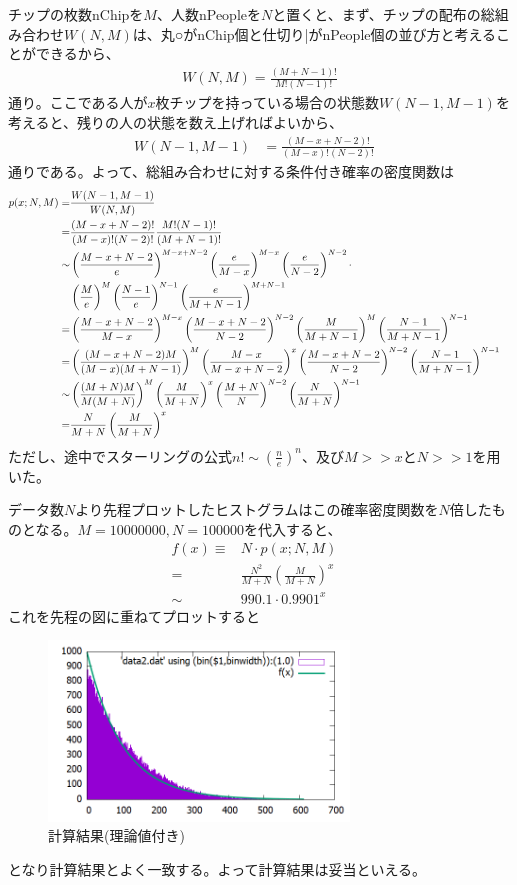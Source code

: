 \documentclass[ %
  platex,%
  papersize,%
  twocolumn,
  landscape
]{jsarticle}
\begin{document}
チップの枚数nChipを$M$、人数nPeopleを$N$と置くと、まず、チップの配布の総組み合わせ$W(N,M)$は、丸○がnChip個と仕切り|がnPeople個の並び方と考えることができるから、
\begin{align}
  W(N,M)=\frac{(M+N-1)!}{M!(N-1)!}
\end{align}
通り。ここである人が$x$枚チップを持っている場合の状態数$W(N-1,M-1)$を考えると、残りの人の状態を数え上げればよいから、
\begin{align}
  W(N-1,M-1)&=\frac{(M-x+N-2)!}{(M-x)!(N-2)!}&
\end{align}
通りである。よって、総組み合わせに対する条件付き確率の密度関数は
\begin{align}
  p(x;N,M)=&\frac{W(N-1,M-1)}{W(N,M)}&\\
  =&\frac{(M-x+N-2)!}{(M-x)!(N-2)!}\frac{M!(N-1)!}{(M+N-1)!}&\\
  \sim&\left(\frac{M-x+N-2}{e}\right)^{M-x+N-2}\left(\frac{e}{M-x}\right)^{M-x}\left(\frac{e}{N-2}\right)^{N-2}\cdot\relax&\\\nonumber&\left(\frac{M}{e}\right)^{M}\left(\frac{N-1}{e}\right)^{N-1}\left(\frac{e}{M+N-1}\right)^{M+N-1}&\\
  =&\left(\frac{M-x+N-2}{M-x}\right)^{M-x}\left(\frac{M-x+N-2}{N-2}\right)^{N-2}\left(\frac{M}{M+N-1}\right)^{M}\left(\frac{N-1}{M+N-1}\right)^{N-1}&\\
  =&\left(\frac{(M-x+N-2)M}{(M-x)(M+N-1)}\right)^{M}\left(\frac{M-x}{M-x+N-2}\right)^{x}\left(\frac{M-x+N-2}{N-2}\right)^{N-2}\left(\frac{N-1}{M+N-1}\right)^{N-1}&\\
  \sim&\left(\frac{(M+N)M}{M(M+N)}\right)^{M}\left(\frac{M}{M+N}\right)^{x}\left(\frac{M+N}{N}\right)^{N-2}\left(\frac{N}{M+N}\right)^{N-1}&\\
  =&\frac{N}{M+N}\left(\frac{M}{M+N}\right)^{x}&
\end{align}
ただし、途中でスターリングの公式$n!\sim(\frac{n}{e})^n$、及び$M>>x$と$N>>1$を用いた。

データ数$N$より先程プロットしたヒストグラムはこの確率密度関数を$N$倍したものとなる。$M=10000000, N=100000$を代入すると、
\begin{align}
  f(x)\equiv&N\cdot p(x;N,M)&\\
  =&\frac{N^2}{M+N}\left(\frac{M}{M+N}\right)^{x}&\\
  \sim&990.1\cdot0.9901^{x}&
\end{align}
これを先程の図に重ねてプロットすると
\begin{figure}[H]
\begin{center}
\includegraphics[width=8cm]{../cpp/out/dice_game/data2_with_theory.png}
\end{center}
\caption{計算結果(理論値付き)}
\end{figure}
となり計算結果とよく一致する。よって計算結果は妥当といえる。
\end{document}
